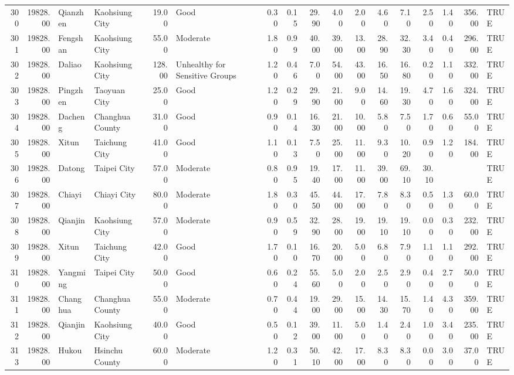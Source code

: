 \begin{table}[ht]
\begin{tabular}{rrllrlrrrrrrrrrrl}
  300 & 19828.00 & Qianzhen & Kaohsiung City & 19.00 & Good & 0.30 & 0.15 & 29.90 & 4.00 & 2.00 & 4.60 & 7.10 & 2.50 & 1.40 & 356.00 & TRUE \\ 
  301 & 19828.00 & Fengshan & Kaohsiung City & 55.00 & Moderate & 1.80 & 0.99 & 40.00 & 39.00 & 13.00 & 28.90 & 32.30 & 3.40 & 0.40 & 296.00 & TRUE \\ 
  302 & 19828.00 & Daliao & Kaohsiung City & 128.00 & Unhealthy for Sensitive Groups & 1.20 & 0.46 & 7.00 & 54.00 & 43.00 & 16.50 & 16.80 & 0.20 & 1.10 & 332.00 & TRUE \\ 
  303 & 19828.00 & Pingzhen & Taoyuan City & 25.00 & Good & 1.20 & 0.29 & 29.90 & 21.00 & 9.00 & 14.60 & 19.30 & 4.70 & 1.60 & 324.00 & TRUE \\ 
  304 & 19828.00 & Dacheng & Changhua County & 31.00 & Good & 0.90 & 0.14 & 16.30 & 21.00 & 10.00 & 5.80 & 7.50 & 1.70 & 0.60 & 55.00 & TRUE \\ 
  305 & 19828.00 & Xitun & Taichung City & 41.00 & Good & 1.10 & 0.13 & 7.50 & 25.00 & 11.00 & 9.30 & 10.20 & 0.90 & 1.20 & 184.00 & TRUE \\ 
  306 & 19828.00 & Datong & Taipei City & 57.00 & Moderate & 0.80 & 0.95 & 19.40 & 17.00 & 11.00 & 39.00 & 69.10 & 30.10 &  &  & TRUE \\ 
  307 & 19828.00 & Chiayi & Chiayi City & 80.00 & Moderate & 1.80 & 0.30 & 45.50 & 44.00 & 17.00 & 7.80 & 8.30 & 0.50 & 1.30 & 60.00 & TRUE \\ 
  308 & 19828.00 & Qianjin & Kaohsiung City & 57.00 & Moderate & 0.90 & 0.59 & 32.90 & 28.00 & 19.00 & 19.10 & 19.10 & 0.00 & 0.30 & 232.00 & TRUE \\ 
  309 & 19828.00 & Xitun & Taichung City & 42.00 & Good & 1.70 & 0.10 & 16.70 & 20.00 & 5.00 & 6.80 & 7.90 & 1.10 & 1.10 & 292.00 & TRUE \\ 
  310 & 19828.00 & Yangming & Taipei City & 50.00 & Good & 0.60 & 0.24 & 55.60 & 5.00 & 2.00 & 2.50 & 2.90 & 0.40 & 2.70 & 50.00 & TRUE \\ 
  311 & 19828.00 & Changhua & Changhua County & 55.00 & Moderate & 0.70 & 0.44 & 19.00 & 29.00 & 15.00 & 14.30 & 15.70 & 1.40 & 4.30 & 359.00 & TRUE \\ 
  312 & 19828.00 & Qianjin & Kaohsiung City & 40.00 & Good & 0.50 & 0.12 & 39.00 & 11.00 & 5.00 & 1.40 & 2.40 & 1.00 & 3.40 & 235.00 & TRUE \\ 
  313 & 19828.00 & Hukou & Hsinchu County & 60.00 & Moderate & 1.20 & 0.31 & 50.10 & 42.00 & 17.00 & 8.30 & 8.30 & 0.00 & 3.00 & 37.00 & TRUE \\ 

\end{tabular}
\end{table}
